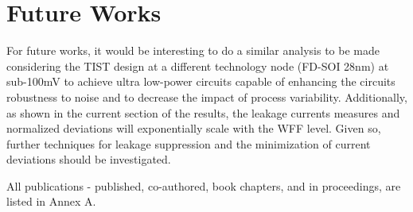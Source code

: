 \documentclass[pgmicro,diss,english]{iiufrgs}
\begin{document}
\begin{table}[]
\centering
\caption{Current results for the FAs considering the product between measures and deviations for dynamic and static currents.}
\label{tab:FACurr}
\end{table}

\section{Future Works}

For future works, it would be interesting to do a similar analysis to be made considering the TIST design at a different technology node (FD-SOI 28nm) at sub-100mV to achieve ultra low-power circuits capable of enhancing the circuits robustness to noise and to decrease the impact of process variability. Additionally, as shown in the current section of the results, the leakage currents measures and normalized deviations will exponentially scale with the WFF level. Given so, further techniques for leakage suppression and the minimization of current deviations should be investigated.

All publications - published, co-authored, book chapters, and in proceedings, are listed in Annex A.
\end{document}
